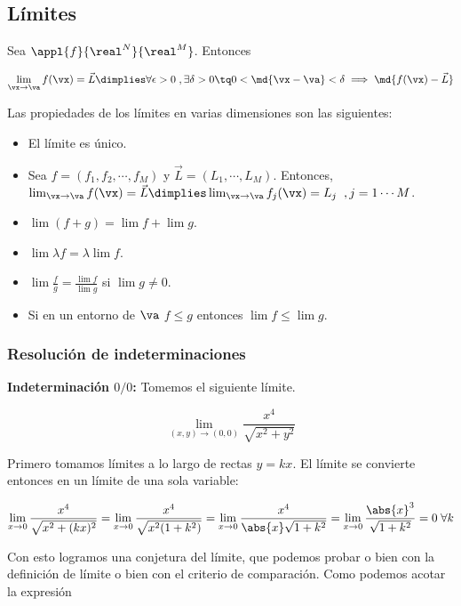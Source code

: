 \documentclass[12pt,a4paper,titlepage]{apuntes}
\begin{document}
\subsection{Límites}
\begin{defn}Sea $\appl{f}{\real^N}{\real^M}$. Entonces

\[ \lim_{\vx\to\va} f(\vx) = \vec{L} \dimplies \forall \epsilon >0\; , \exists \delta > 0 \tq 0<\md{\vx-\va} < \delta \implies \md{f(\vx ) - \vec{L}} \]

\end{defn}


Las propiedades de los límites en varias dimensiones son las siguientes:

\begin{itemize}
\item El límite es único.
\item Sea $f=(f_1, f_2,\cdots, f_M)$ y $\vec{L} = (L_1, \cdots, L_M)$. Entonces, $\lim_{\vx\to\va} f(\vx) = \vec{L} \dimplies \lim_{\vx\to\va} f_j(\vx) = L_j\;\; , j=1\cdots M$.
\item $\lim (f+g) = \lim f +\lim g$.
\item $\lim \lambda f = \lambda \lim f$.
\item $\lim \frac{f}{g} = \frac{\lim f}{\lim g}$ si $\lim g \neq 0$.
\item Si en un entorno de $\va$ $f\leq g$ entonces $\lim f \leq \lim g$.
\end{itemize}

\subsubsection{Resolución de indeterminaciones}

\textbf{Indeterminación $0/0$:} Tomemos el siguiente límite.

\[ \lim_{(x,y)\to(0,0)} \frac{x^4}{\sqrt{x^2+y^2}} \]

Primero tomamos límites a lo largo de rectas $y=kx$. El límite se convierte entonces en un límite de una sola variable:

\[\lim_{x\to 0} \frac{x^4}{\sqrt{x^2+(kx)^2}} = \lim_{x\to 0} \frac{x^4}{\sqrt{x^2(1+k^2)}} = \lim_{x\to 0} \frac{x^4}{\abs{x}\sqrt{1+k^2}} = \lim_{x\to 0} \frac{\abs{x}^3}{\sqrt{1+k^2}} = 0\; \forall k\]

Con esto logramos una conjetura del límite, que podemos probar o bien con la definición de límite o bien con el criterio de comparación. Como podemos acotar la expresión
\end{document}

